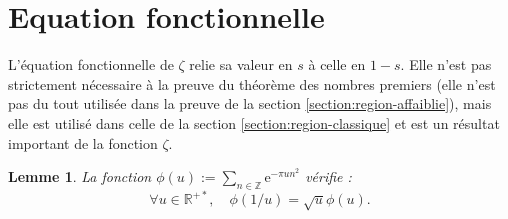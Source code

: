 \documentclass[french]{report}
\newtheorem{proposition}[theorem]{Proposition}
\newtheorem{lemma}[theorem]{Lemme}
\begin{document}




\section{Equation fonctionnelle}

L'équation fonctionnelle de $\zeta$ relie sa valeur en $s$ à celle en $1-s$. Elle n'est pas strictement nécessaire à la preuve du théorème des nombres premiers (elle n'est pas du tout utilisée dans la preuve de la section \ref{section:region-affaiblie}), mais elle est utilisé dans celle de la section \ref{section:region-classique} et est un résultat important de la fonction $\zeta$.

\begin{lemma}
  La fonction $\phi(u):=\sum_{n\in\mathbb{Z}}\mathrm{e}^{-\pi un^2}$ vérifie :
  \[
    \forall u\in\mathbb{R}^{+*},\quad
    \phi(1/u)=\sqrt{u}\phi(u).
  \]
\end{lemma}
\end{document}
